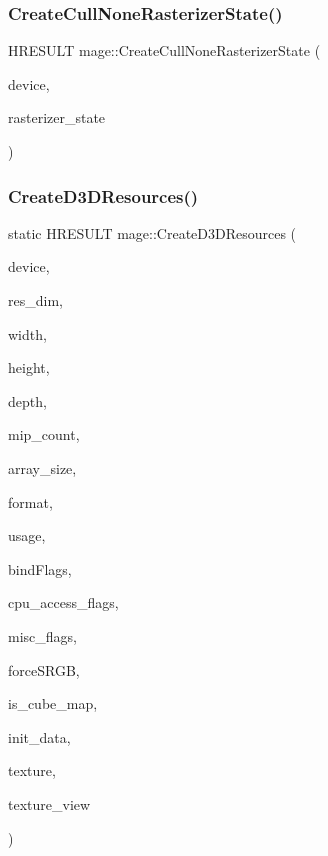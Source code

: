 \subsubsection{\texorpdfstring{Create\+Cull\+None\+Rasterizer\+State()}{CreateCullNoneRasterizerState()}}
{\footnotesize\ttfamily H\+R\+E\+S\+U\+LT mage\+::\+Create\+Cull\+None\+Rasterizer\+State (\begin{DoxyParamCaption}\item[{I\+D3\+D11\+Device2 $\ast$}]{device,  }\item[{I\+D3\+D11\+Rasterizer\+State $\ast$$\ast$}]{rasterizer\+\_\+state }\end{DoxyParamCaption})}

\hypertarget{namespacemage_a45746b9c8018b682c999fe1c5d4158db}{}\label{namespacemage_a45746b9c8018b682c999fe1c5d4158db} 
\subsubsection{\texorpdfstring{Create\+D3\+D\+Resources()}{CreateD3DResources()}}
{\footnotesize\ttfamily static H\+R\+E\+S\+U\+LT mage\+::\+Create\+D3\+D\+Resources (\begin{DoxyParamCaption}\item[{\+\_\+\+In\+\_\+ I\+D3\+D11\+Device2 $\ast$}]{device,  }\item[{\+\_\+\+In\+\_\+ uint32\+\_\+t}]{res\+\_\+dim,  }\item[{\+\_\+\+In\+\_\+ size\+\_\+t}]{width,  }\item[{\+\_\+\+In\+\_\+ size\+\_\+t}]{height,  }\item[{\+\_\+\+In\+\_\+ size\+\_\+t}]{depth,  }\item[{\+\_\+\+In\+\_\+ size\+\_\+t}]{mip\+\_\+count,  }\item[{\+\_\+\+In\+\_\+ size\+\_\+t}]{array\+\_\+size,  }\item[{\+\_\+\+In\+\_\+ D\+X\+G\+I\+\_\+\+F\+O\+R\+M\+AT}]{format,  }\item[{\+\_\+\+In\+\_\+ D3\+D11\+\_\+\+U\+S\+A\+GE}]{usage,  }\item[{\+\_\+\+In\+\_\+ uint32\+\_\+t}]{bind\+Flags,  }\item[{\+\_\+\+In\+\_\+ uint32\+\_\+t}]{cpu\+\_\+access\+\_\+flags,  }\item[{\+\_\+\+In\+\_\+ uint32\+\_\+t}]{misc\+\_\+flags,  }\item[{\+\_\+\+In\+\_\+ bool}]{force\+S\+R\+GB,  }\item[{\+\_\+\+In\+\_\+ bool}]{is\+\_\+cube\+\_\+map,  }\item[{\+\_\+\+In\+\_\+reads\+\_\+opt\+\_\+(mip\+\_\+count $\ast$array\+\_\+size) D3\+D11\+\_\+\+S\+U\+B\+R\+E\+S\+O\+U\+R\+C\+E\+\_\+\+D\+A\+TA $\ast$}]{init\+\_\+data,  }\item[{\+\_\+\+Outptr\+\_\+opt\+\_\+ I\+D3\+D11\+Resource $\ast$$\ast$}]{texture,  }\item[{\+\_\+\+Outptr\+\_\+opt\+\_\+ I\+D3\+D11\+Shader\+Resource\+View $\ast$$\ast$}]{texture\+\_\+view }\end{DoxyParamCaption})\hspace{0.3cm}{\ttfamily [static]}}

